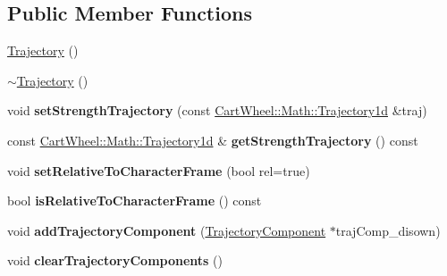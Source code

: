 \subsection*{Public Member Functions}
\begin{DoxyCompactItemize}
\item 
\hyperlink{classCartWheel_1_1Core_1_1Trajectory_af5db24d3bcd91471ca712478355aa3f5}{Trajectory} ()
\item 
\hyperlink{classCartWheel_1_1Core_1_1Trajectory_a56e5f2ae7e84baa24bab3385f1b742a6}{$\sim$Trajectory} ()
\item 
\hypertarget{classCartWheel_1_1Core_1_1Trajectory_a8099cbad535977fec3268f7b69cfa36a}{
void {\bfseries setStrengthTrajectory} (const \hyperlink{classCartWheel_1_1Math_1_1GenericTrajectory}{CartWheel::Math::Trajectory1d} \&traj)}
\label{classCartWheel_1_1Core_1_1Trajectory_a8099cbad535977fec3268f7b69cfa36a}

\item 
\hypertarget{classCartWheel_1_1Core_1_1Trajectory_a62195dd02631b5e826bb40f012d60f0b}{
const \hyperlink{classCartWheel_1_1Math_1_1GenericTrajectory}{CartWheel::Math::Trajectory1d} \& {\bfseries getStrengthTrajectory} () const }
\label{classCartWheel_1_1Core_1_1Trajectory_a62195dd02631b5e826bb40f012d60f0b}

\item 
\hypertarget{classCartWheel_1_1Core_1_1Trajectory_a379f64bd3726139d4f5a370bf7e4102e}{
void {\bfseries setRelativeToCharacterFrame} (bool rel=true)}
\label{classCartWheel_1_1Core_1_1Trajectory_a379f64bd3726139d4f5a370bf7e4102e}

\item 
\hypertarget{classCartWheel_1_1Core_1_1Trajectory_a15cb897978259e847b025d37c5207a83}{
bool {\bfseries isRelativeToCharacterFrame} () const }
\label{classCartWheel_1_1Core_1_1Trajectory_a15cb897978259e847b025d37c5207a83}

\item 
\hypertarget{classCartWheel_1_1Core_1_1Trajectory_a216883544d0cb40d0f6273591cbd8199}{
void {\bfseries addTrajectoryComponent} (\hyperlink{classCartWheel_1_1Core_1_1TrajectoryComponent}{TrajectoryComponent} $\ast$trajComp\_\-disown)}
\label{classCartWheel_1_1Core_1_1Trajectory_a216883544d0cb40d0f6273591cbd8199}

\item 
\hypertarget{classCartWheel_1_1Core_1_1Trajectory_acb8de434834b5c69e2eb5ea746917460}{
void {\bfseries clearTrajectoryComponents} ()}
\label{classCartWheel_1_1Core_1_1Trajectory_acb8de434834b5c69e2eb5ea746917460}


\end{DoxyCompactItemize}
